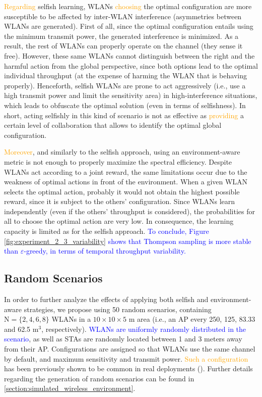 \documentclass[preprint,12pt]{elsarticle}
\begin{document}
\textcolor{orange}{Regarding} selfish learning, WLANs \textcolor{orange}{choosing} the optimal configuration are more susceptible to be affected by inter-WLAN interference (asymmetries between WLANs are generated). First of all, since the optimal configuration entails using the minimum transmit power, the generated interference is minimized. As a result, the rest of WLANs can properly operate on the channel (they sense it free). However, these same WLANs cannot distinguish between the right and the harmful action from the global perspective, since both options lead to the optimal individual throughput (at the expense of harming the WLAN that is behaving properly). Henceforth, selfish WLANs are prone to act aggressively (i.e., use a high transmit power and limit the sensitivity area) in high-interference situations, which leads to obfuscate the optimal solution (even in terms of selfishness). In short, acting selfishly in this kind of scenario is not as effective as \textcolor{orange}{providing} a certain level of collaboration that allows to identify the optimal global configuration.

\textcolor{orange}{Moreover}, and similarly to the selfish approach, using an environment-aware metric is not enough to properly maximize the spectral efficiency. Despite WLANs act according to a joint reward, the same limitations occur due to the weakness of optimal actions in front of the environment. When a given WLAN selects the optimal action, probably it would not obtain the highest possible reward, since it is subject to the others' configuration. Since WLANs learn independently (even if the others' throughput is considered), the probabilities for all to choose the optimal action are very low. In consequence, the learning capacity is limited as for the selfish approach. \textcolor{blue}{To conclude, Figure \ref{fig:experiment_2_3_variability} shows that Thompson sampling is more stable than $\varepsilon$-greedy, in terms of temporal throughput variability.} 

\subsection{Random Scenarios}
\label{section:scalability}	
In order to further analyze the effects of applying both selfish and environment-aware strategies, we propose using 50 random scenarios, containing $\text{N} = \{2, 4, 6, 8\}$ WLANs in a $10\times10\times5$ m area (i.e., an AP every 250, 125, 83.33 and 62.5 $\text{m}^3$, respectively). \textcolor{blue}{WLANs are uniformly randomly distributed in the scenario}, as well as STAs are randomly located between 1 and 3 meters away from their AP. Configurations are assigned so that WLANs use the same channel by default, and maximum sensitivity and transmit power. \textcolor{orange}{Such a configuration} has been previously shown to be common in real deployments (\citealp{akella2007self}). Further details regarding the generation of random scenarios can be found in \ref{section:simulated_wireless_environment}.
\end{document}
